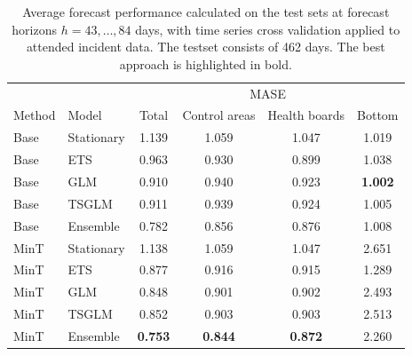 \documentclass[
  authoryear,
  preprint,
  3p]{elsarticle}
\begin{document}
\begin{table}

\caption{\label{tbl-result}Average forecast performance calculated on
the test sets at forecast horizons \(h=43,\dots,84\) days, with time
series cross validation applied to attended incident data. The testset
consists of 462 days. The best approach is highlighted in
bold.}\begin{minipage}[t]{\linewidth}

{\centering 

\tabularnewline

\centering
\begin{tabular}[t]{llcccc}
\toprule
\multicolumn{2}{c}{ } & \multicolumn{4}{c}{MASE} \\
\cmidrule(l{3pt}r{3pt}){3-6}
Method & Model & Total & Control areas & Health boards & Bottom\\
\midrule
Base & Stationary & 1.139 & 1.059 & 1.047 & 1.019\\
Base & ETS & 0.963 & 0.930 & 0.899 & 1.038\\
Base & GLM & 0.910 & 0.940 & 0.923 & \textbf{1.002}\\
Base & TSGLM & 0.911 & 0.939 & 0.924 & 1.005\\
Base & Ensemble & 0.782 & 0.856 & 0.876 & 1.008\\
\addlinespace
MinT & Stationary & 1.138 & 1.059 & 1.047 & 2.651\\
MinT & ETS & 0.877 & 0.916 & 0.915 & 1.289\\
MinT & GLM & 0.848 & 0.901 & 0.902 & 2.493\\
MinT & TSGLM & 0.852 & 0.903 & 0.903 & 2.513\\
MinT & Ensemble & \textbf{0.753} & \textbf{0.844} & \textbf{0.872} & 2.260\\
\bottomrule
\end{tabular}

}

\end{minipage}%
\newline
\begin{minipage}[t]{\linewidth}

{\centering 

\tabularnewline

}
\end{minipage}
\end{table}
\end{document}
